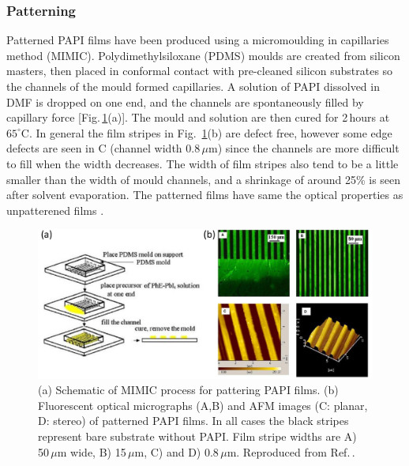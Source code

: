 \subsubsection{Patterning}
Patterned PAPI films have been produced using a micromoulding in capillaries method (MIMIC). Polydimethylsiloxane (PDMS) moulds are created from silicon masters, then placed in conformal contact with pre-cleaned silicon substrates so the channels of the mould formed capillaries. A solution of PAPI dissolved in DMF is dropped on one end, and the channels are spontaneously filled by capillary force [Fig.\,\ref{2Fig11}(a)]. The mould and solution are then cured for 2\,hours at $65^{\circ}$C. In general the film stripes in Fig.\ \ref{2Fig11}(b) are defect free, however some edge defects are seen in C (channel width 0.8\,$\mu$m) since the channels are more difficult to fill when the width decreases. The width of film stripes also tend to be a little smaller than the width of mould channels, and a shrinkage of around 25\% is seen after solvent evaporation.  The patterned films have same the optical properties as unpatterened films \cite{Cheng2003}.
\begin{figure} [h!]
\centering
\includegraphics[width=\textwidth]{Fig11}
\caption{(a) Schematic of MIMIC process for pattering PAPI films. (b) Fluorescent optical micrographs (A,B) and AFM images (C: planar, D: stereo) of patterned PAPI films. In all cases the black stripes represent bare substrate without PAPI. Film stripe widths are A) 50\,$\mu$m wide, B) 15\,$\mu$m, C) and D) 0.8\,$\mu$m. Reproduced from Ref.\,\cite{Cheng2003}.}
\label{2Fig11}
\end{figure}


